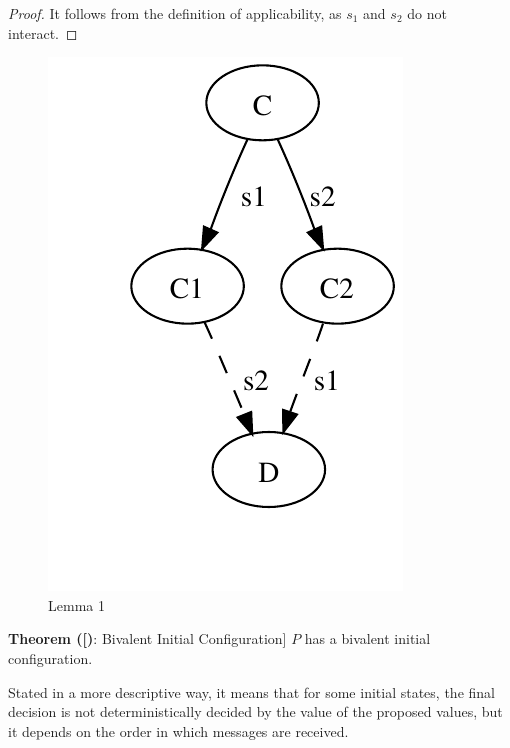 \documentclass[12pt]{article}
\newenvironment{lemma}[1]{\textbf{Theorem (#1)}: }{\medskip}
\begin{document}
\begin{proof}
It follows from the definition of applicability, as $s_1$ and $s_2$ do not
interact.
\end{proof}

\begin{figure}
\begin{center}
\includegraphics{figs/06/consensus-fig1.pdf}
\end{center}
\caption{Lemma 1}
\end{figure}


\newpage
\begin{lemma}[Bivalent Initial Configuration]
$P$ has a bivalent initial configuration. 
\end{lemma}

Stated in a more descriptive way, it means that for some initial
states, the final decision is not deterministically decided by 
the value of the proposed values, but it depends on the order
in which messages are received.
\end{document}
